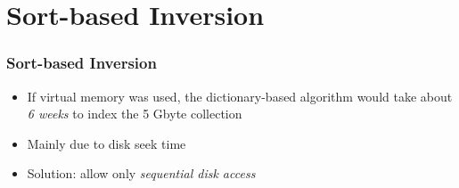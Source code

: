 \documentclass[svgnames]{beamer}
\begin{document}

\section{Sort-based Inversion}

\begin{frame}
    \frametitle{Sort-based Inversion}
    
    \begin{block}{}
        \begin{itemize}
        \item If virtual memory was used, the dictionary-based algorithm would take
            about \emph{6 weeks} to index the 5 Gbyte collection
        \item Mainly due to disk seek time
        \item Solution: allow only \emph{sequential disk access}
        \end{itemize}
    \end{block}

\end{frame}


\setcounter{num}{0}
\end{document}
